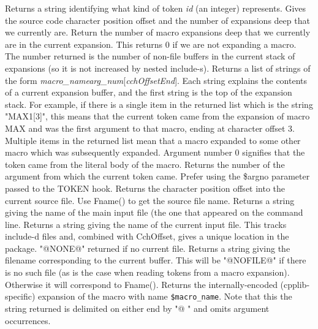 Returns a string identifying what kind of token \textit{id} (an integer) represents.
Gives the source code character position offset and the number of expansions
deep that we currently are.
Return the number of macro expansions deep that we currently are in
the current expansion.  This returns 0 if we are not expanding a macro.
The number returned is the number of non-file buffers in the current
stack of expansions (so it is not increased by nested \pphash{}include-s).
Returns a list of strings of the form 
\textit{macro\_\-name}\pphash{}\textit{arg\_\-num}[\textit{cchOffsetEnd}]. 
Each string explains the contents of a current expansion buffer,
and the first string is the top of the expansion stack.
For example, if there is a single item in the returned list
which is the string "MAX\pphash{}1[3]", this means that the current
token came from the expansion of macro MAX and was the first argument
to that macro, ending at character offset 3.  Multiple items
in the returned list mean that a macro expanded to some other
macro which was subsequently expanded.  Argument number 0 signifies
that the token came from the literal body of the macro.
Returns the number of the argument from which the current token came.
Prefer using the \$argno parameter passed to the TOKEN hook.
Returns the character position offset into the current source file.
Use Fname() to get the source file name.
Returns a string giving the name of the main input file (the one
that appeared on the command line.
Returns a string giving the name of the current input file.  This
tracks include-d files and, combined with CchOffset, gives a
unique location in the package.  "@NONE@" returned if no current file.
Returns a string giving the filename corresponding to the current
buffer.  This will be "@NOFILE@" if there is no such file (as is
the case when reading tokens from a macro expansion).
Otherwise it will correspond to Fname().
Returns the internally-encoded (cpplib-specific) expansion of
the macro with name \texttt{\$macro\_\-name}.  Note that this the string
returned is delimited on either end by "@ " and omits argument occurrences.
